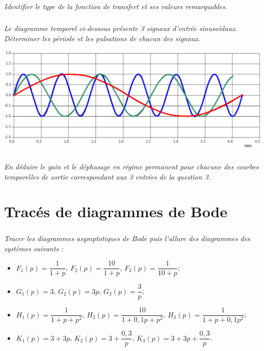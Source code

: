 \documentclass[10pt,fleqn]{article} %
\begin{document}
\begin{multicols}{2}
\subparagraph{}
\textit{Identifier le type de la fonction de transfert et ses valeurs remarquables.}


\subparagraph{}
\textit{Le diagramme temporel ci-dessous présente 3 signaux d'entrée sinusoïdaux. Déterminer les période et les pulsations de chacun des signaux. }


\begin{center}
\includegraphics[width=\linewidth]{images/img_02}
\end{center}


\ifprof
\else
\fi


\subparagraph{}
\textit{En déduire le gain et le déphasage en régime permanent pour chacune des courbes temporelles de sortie correspondant aux 3 entrées de la question 3. }
\ifprof
\else
\fi



\setcounter{exo}{0}
\section*{Tracés de diagrammes de Bode}

\subparagraph*{}
\textit{Tracer les diagrammes asymptotiques de Bode puis l'allure des diagrammes des systèmes suivants : }

\begin{itemize}
\item $F_1(p) = \dfrac{1}{1+p}$, $F_2(p) = \dfrac{10}{1+p}$, $F_3(p) = \dfrac{1}{10+p}$; 
\item $G_1(p) = 3$, $G_2(p) = 3p$, $G_3(p) = \dfrac{3}{p}$;
\item $H_1(p)=\dfrac{1}{1+p+p^2}$, $H_2(p)=\dfrac{10}{1+0,1p+p^2}$, $H_3(p)=\dfrac{1}{1+p+0,1p^2}$;
\item $K_1(p)=3+3p$, $K_2(p)=3+\dfrac{0,3}{p}$, $K_3(p)=3+3p+\dfrac{0,3}{p}$.
\end{itemize}
\ifprof
\else
\fi


\end{multicols}
\end{document}
